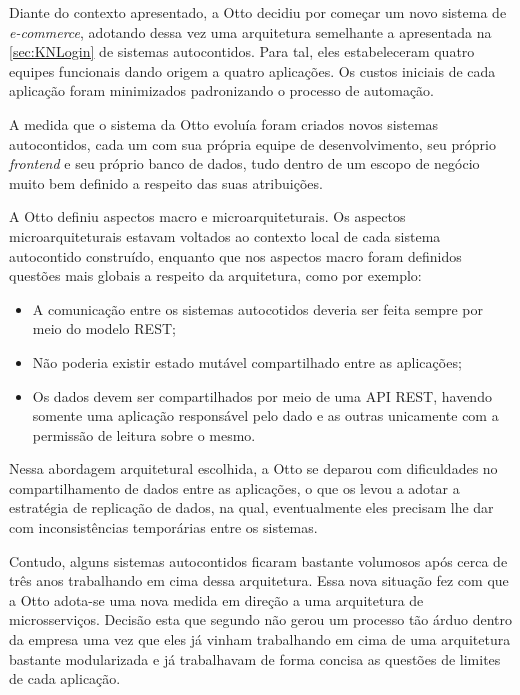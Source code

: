 Diante do contexto apresentado, a Otto decidiu por começar um novo sistema de \textit{e-commerce},
adotando dessa vez uma arquitetura semelhante a apresentada na \autoref{sec:KNLogin} de sistemas autocontidos. Para
tal, eles estabeleceram quatro equipes funcionais dando origem a quatro aplicações. Os custos
iniciais de cada aplicação foram minimizados padronizando o processo de automação.

A medida que o sistema da Otto evoluía foram criados novos sistemas autocontidos, cada um com sua própria equipe
de desenvolvimento, seu próprio \textit{frontend} e seu próprio
banco de dados, tudo dentro de um escopo de negócio muito bem definido a respeito das suas
atribuições.

A Otto definiu aspectos macro e microarquiteturais. Os aspectos
microarquiteturais estavam voltados ao contexto local de cada sistema autocontido construído,
enquanto que nos aspectos macro foram definidos questões mais globais a respeito da arquitetura, como por exemplo:

\begin{itemize}
    \item A comunicação entre os sistemas autocotidos deveria ser feita sempre por meio do modelo
        \gls{REST};
    \item Não poderia existir estado mutável compartilhado entre as aplicações;
    \item Os dados devem ser compartilhados por meio de uma \gls{API} \gls{REST}, havendo somente
        uma aplicação responsável pelo dado e as outras unicamente com a permissão de leitura sobre o
        mesmo.
\end{itemize}

Nessa abordagem arquitetural escolhida, a Otto se deparou com dificuldades no compartilhamento
de dados entre as aplicações, o que os levou a adotar a estratégia de replicação de dados, na qual,
eventualmente eles precisam lhe dar com inconsistências temporárias entre os sistemas.

Contudo, alguns sistemas autocontidos ficaram bastante volumosos após cerca de três anos trabalhando
em cima dessa arquitetura. Essa nova situação fez com que a Otto adota-se uma nova medida em direção
a uma arquitetura de microsserviços. Decisão esta que segundo 
não gerou um processo tão árduo dentro da empresa uma vez que eles já vinham trabalhando em cima de
uma arquitetura bastante modularizada e já trabalhavam de forma concisa as questões de limites de
cada aplicação.

